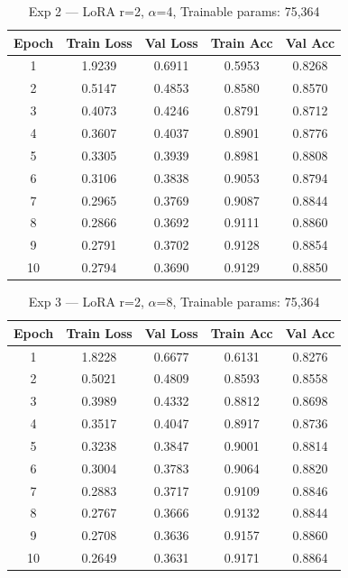 \documentclass[12pt,a4paper]{article}
\begin{document}
\begin{table}[H]
\centering
\caption{Exp 2 — LoRA r=2, $\alpha$=4, Trainable params: 75,364}
\small
\begin{tabular}{ccccc}
\toprule
Epoch & Train Loss & Val Loss & Train Acc & Val Acc \\ \midrule
1  & 1.9239 & 0.6911 & 0.5953 & 0.8268 \\
2  & 0.5147 & 0.4853 & 0.8580 & 0.8570 \\
3  & 0.4073 & 0.4246 & 0.8791 & 0.8712 \\
4  & 0.3607 & 0.4037 & 0.8901 & 0.8776 \\
5  & 0.3305 & 0.3939 & 0.8981 & 0.8808 \\
6  & 0.3106 & 0.3838 & 0.9053 & 0.8794 \\
7  & 0.2965 & 0.3769 & 0.9087 & 0.8844 \\
8  & 0.2866 & 0.3692 & 0.9111 & 0.8860 \\
9  & 0.2791 & 0.3702 & 0.9128 & 0.8854 \\
10 & 0.2794 & 0.3690 & 0.9129 & 0.8850 \\
\bottomrule
\end{tabular}
\end{table}

\begin{table}[H]
\centering
\caption{Exp 3 — LoRA r=2, $\alpha$=8, Trainable params: 75,364}
\small
\begin{tabular}{ccccc}
\toprule
Epoch & Train Loss & Val Loss & Train Acc & Val Acc \\ \midrule
1  & 1.8228 & 0.6677 & 0.6131 & 0.8276 \\
2  & 0.5021 & 0.4809 & 0.8593 & 0.8558 \\
3  & 0.3989 & 0.4332 & 0.8812 & 0.8698 \\
4  & 0.3517 & 0.4047 & 0.8917 & 0.8736 \\
5  & 0.3238 & 0.3847 & 0.9001 & 0.8814 \\
6  & 0.3004 & 0.3783 & 0.9064 & 0.8820 \\
7  & 0.2883 & 0.3717 & 0.9109 & 0.8846 \\
8  & 0.2767 & 0.3666 & 0.9132 & 0.8844 \\
9  & 0.2708 & 0.3636 & 0.9157 & 0.8860 \\
10 & 0.2649 & 0.3631 & 0.9171 & 0.8864 \\
\bottomrule
\end{tabular}
\end{table}
\end{document}
